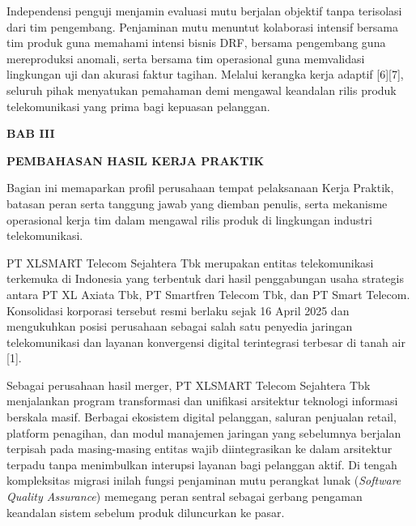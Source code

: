 \documentclass[12pt,a4paper]{article}
\begin{document}
Independensi penguji menjamin evaluasi mutu berjalan objektif tanpa terisolasi dari tim pengembang. Penjaminan mutu menuntut kolaborasi intensif bersama tim produk guna memahami intensi bisnis DRF, bersama pengembang guna mereproduksi anomali, serta bersama tim operasional guna memvalidasi lingkungan uji dan akurasi faktur tagihan. Melalui kerangka kerja adaptif [6][7], seluruh pihak menyatukan pemahaman demi mengawal keandalan rilis produk telekomunikasi yang prima bagi kepuasan pelanggan.

\clearpage
\begin{center}
    {\bfseries\large BAB III\par}
    {\bfseries\large PEMBAHASAN HASIL KERJA PRAKTIK\par}
\end{center}
\vspace{0.4cm}

Bagian ini memaparkan profil perusahaan tempat pelaksanaan Kerja Praktik, batasan peran serta tanggung jawab yang diemban penulis, serta mekanisme operasional kerja tim dalam mengawal rilis produk di lingkungan industri telekomunikasi.

\vspace{0.2cm}
PT XLSMART Telecom Sejahtera Tbk merupakan entitas telekomunikasi terkemuka di Indonesia yang terbentuk dari hasil penggabungan usaha strategis antara PT XL Axiata Tbk, PT Smartfren Telecom Tbk, dan PT Smart Telecom. Konsolidasi korporasi tersebut resmi berlaku sejak 16 April 2025 dan mengukuhkan posisi perusahaan sebagai salah satu penyedia jaringan telekomunikasi dan layanan konvergensi digital terintegrasi terbesar di tanah air [1].

Sebagai perusahaan hasil merger, PT XLSMART Telecom Sejahtera Tbk menjalankan program transformasi dan unifikasi arsitektur teknologi informasi berskala masif. Berbagai ekosistem digital pelanggan, saluran penjualan retail, platform penagihan, dan modul manajemen jaringan yang sebelumnya berjalan terpisah pada masing-masing entitas wajib diintegrasikan ke dalam arsitektur terpadu tanpa menimbulkan interupsi layanan bagi pelanggan aktif. Di tengah kompleksitas migrasi inilah fungsi penjaminan mutu perangkat lunak (\textit{Software Quality Assurance}) memegang peran sentral sebagai gerbang pengaman keandalan sistem sebelum produk diluncurkan ke pasar.
\end{document}
